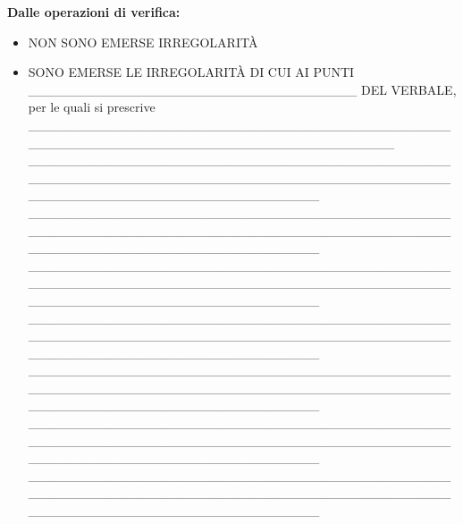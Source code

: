 \documentclass[12pt]{article}
\begin{document}
\textbf{Dalle operazioni di verifica:}
\begin{itemize}
 \renewcommand{\labelitemi}{\scriptsize\begin{math}\square\end{math}}
 \item NON SONO EMERSE IRREGOLARITÀ
 \item SONO EMERSE LE IRREGOLARITÀ DI CUI AI PUNTI \_\_\_\_\_\_\_\_\_\_\_\_\_\_\_\_\_\_\_\_\_\_\_\_\_\_\_\_\_\_\_\_\_\_\_ DEL VERBALE, per le quali si prescrive \_\_\_\_\_\_\_\_\_\_\_\_\_\_\_\_\_\_\_\_\_\_\_\_\_\_\_\_\_\_\_\_\_\_\_\_\_\_\_\_\_\_\_\_\_\_\_\_\_\_\_\_\_\_\_\_\_\_\_\_\_\_\_\_\_\_\_\_\_\_\_\_\_\_\_\_\_\_\_\_\_\_\_\_ \\
\_\_\_\_\_\_\_\_\_\_\_\_\_\_\_\_\_\_\_\_\_\_\_\_\_\_\_\_\_\_\_\_\_\_\_\_\_\_\_\_\_\_\_\_\_\_\_\_\_\_\_\_\_\_\_\_\_\_\_\_\_\_\_\_\_\_\_\_\_\_\_\_\_\_\_\_\_\_\_\_\_\_\_\_\_\_\_\_\_\_\_\_\_\_\_\_\_\_\_\_\_\_\_\_\_\_\_\_\_\_\_\_\_\_\_\_\_\_\_\_\_ \\
\_\_\_\_\_\_\_\_\_\_\_\_\_\_\_\_\_\_\_\_\_\_\_\_\_\_\_\_\_\_\_\_\_\_\_\_\_\_\_\_\_\_\_\_\_\_\_\_\_\_\_\_\_\_\_\_\_\_\_\_\_\_\_\_\_\_\_\_\_\_\_\_\_\_\_\_\_\_\_\_\_\_\_\_\_\_\_\_\_\_\_\_\_\_\_\_\_\_\_\_\_\_\_\_\_\_\_\_\_\_\_\_\_\_\_\_\_\_\_\_\_ \\
\_\_\_\_\_\_\_\_\_\_\_\_\_\_\_\_\_\_\_\_\_\_\_\_\_\_\_\_\_\_\_\_\_\_\_\_\_\_\_\_\_\_\_\_\_\_\_\_\_\_\_\_\_\_\_\_\_\_\_\_\_\_\_\_\_\_\_\_\_\_\_\_\_\_\_\_\_\_\_\_\_\_\_\_\_\_\_\_\_\_\_\_\_\_\_\_\_\_\_\_\_\_\_\_\_\_\_\_\_\_\_\_\_\_\_\_\_\_\_\_\_ \\
\_\_\_\_\_\_\_\_\_\_\_\_\_\_\_\_\_\_\_\_\_\_\_\_\_\_\_\_\_\_\_\_\_\_\_\_\_\_\_\_\_\_\_\_\_\_\_\_\_\_\_\_\_\_\_\_\_\_\_\_\_\_\_\_\_\_\_\_\_\_\_\_\_\_\_\_\_\_\_\_\_\_\_\_\_\_\_\_\_\_\_\_\_\_\_\_\_\_\_\_\_\_\_\_\_\_\_\_\_\_\_\_\_\_\_\_\_\_\_\_\_ \\
\_\_\_\_\_\_\_\_\_\_\_\_\_\_\_\_\_\_\_\_\_\_\_\_\_\_\_\_\_\_\_\_\_\_\_\_\_\_\_\_\_\_\_\_\_\_\_\_\_\_\_\_\_\_\_\_\_\_\_\_\_\_\_\_\_\_\_\_\_\_\_\_\_\_\_\_\_\_\_\_\_\_\_\_\_\_\_\_\_\_\_\_\_\_\_\_\_\_\_\_\_\_\_\_\_\_\_\_\_\_\_\_\_\_\_\_\_\_\_\_\_ \\
\_\_\_\_\_\_\_\_\_\_\_\_\_\_\_\_\_\_\_\_\_\_\_\_\_\_\_\_\_\_\_\_\_\_\_\_\_\_\_\_\_\_\_\_\_\_\_\_\_\_\_\_\_\_\_\_\_\_\_\_\_\_\_\_\_\_\_\_\_\_\_\_\_\_\_\_\_\_\_\_\_\_\_\_\_\_\_\_\_\_\_\_\_\_\_\_\_\_\_\_\_\_\_\_\_\_\_\_\_\_\_\_\_\_\_\_\_\_\_\_\_ \\
\_\_\_\_\_\_\_\_\_\_\_\_\_\_\_\_\_\_\_\_\_\_\_\_\_\_\_\_\_\_\_\_\_\_\_\_\_\_\_\_\_\_\_\_\_\_\_\_\_\_\_\_\_\_\_\_\_\_\_\_\_\_\_\_\_\_\_\_\_\_\_\_\_\_\_\_\_\_\_\_\_\_\_\_\_\_\_\_\_\_\_\_\_\_\_\_\_\_\_\_\_\_\_\_\_\_\_\_\_\_\_\_\_\_\_\_\_\_\_\_\_ \\

\end{itemize}
\end{document}
